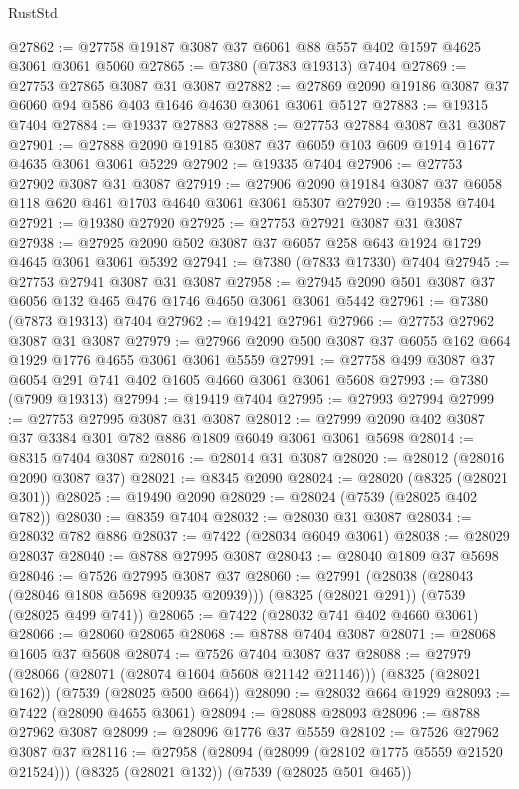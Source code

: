 \begin{lexlean}{RustStd}
\begin{coremodule}
@27862 := @27758 @19187 @3087 @37 @6061 @88 @557 @402 @1597 @4625 @3061 @3061 @5060
@27865 := @7380 (@7383 @19313) @7404
@27869 := @27753 @27865 @3087 @31 @3087
@27882 := @27869 @2090 @19186 @3087 @37 @6060 @94 @586 @403 @1646 @4630 @3061 @3061 @5127
@27883 := @19315 @7404
@27884 := @19337 @27883
@27888 := @27753 @27884 @3087 @31 @3087
@27901 := @27888 @2090 @19185 @3087 @37 @6059 @103 @609 @1914 @1677 @4635 @3061 @3061 @5229
@27902 := @19335 @7404
@27906 := @27753 @27902 @3087 @31 @3087
@27919 := @27906 @2090 @19184 @3087 @37 @6058 @118 @620 @461 @1703 @4640 @3061 @3061 @5307
@27920 := @19358 @7404
@27921 := @19380 @27920
@27925 := @27753 @27921 @3087 @31 @3087
@27938 := @27925 @2090 @502 @3087 @37 @6057 @258 @643 @1924 @1729 @4645 @3061 @3061 @5392
@27941 := @7380 (@7833 @17330) @7404
@27945 := @27753 @27941 @3087 @31 @3087
@27958 := @27945 @2090 @501 @3087 @37 @6056 @132 @465 @476 @1746 @4650 @3061 @3061 @5442
@27961 := @7380 (@7873 @19313) @7404
@27962 := @19421 @27961
@27966 := @27753 @27962 @3087 @31 @3087
@27979 := @27966 @2090 @500 @3087 @37 @6055 @162 @664 @1929 @1776 @4655 @3061 @3061 @5559
@27991 := @27758 @499 @3087 @37 @6054 @291 @741 @402 @1605 @4660 @3061 @3061 @5608
@27993 := @7380 (@7909 @19313)
@27994 := @19419 @7404
@27995 := @27993 @27994
@27999 := @27753 @27995 @3087 @31 @3087
@28012 := @27999 @2090 @402 @3087 @37 @3384 @301 @782 @886 @1809 @6049 @3061 @3061 @5698
@28014 := @8315 @7404 @3087
@28016 := @28014 @31 @3087
@28020 := @28012 (@28016 @2090 @3087 @37)
@28021 := @8345 @2090
@28024 := @28020 (@8325 (@28021 @301))
@28025 := @19490 @2090
@28029 := @28024 (@7539 (@28025 @402 @782))
@28030 := @8359 @7404
@28032 := @28030 @31 @3087
@28034 := @28032 @782 @886
@28037 := @7422 (@28034 @6049 @3061)
@28038 := @28029 @28037
@28040 := @8788 @27995 @3087
@28043 := @28040 @1809 @37 @5698
@28046 := @7526 @27995 @3087 @37
@28060 := @27991
    (@28038 (@28043 (@28046 @1808 @5698 @20935 @20939)))
    (@8325 (@28021 @291))
    (@7539 (@28025 @499 @741))
@28065 := @7422 (@28032 @741 @402 @4660 @3061)
@28066 := @28060 @28065
@28068 := @8788 @7404 @3087
@28071 := @28068 @1605 @37 @5608
@28074 := @7526 @7404 @3087 @37
@28088 := @27979
    (@28066 (@28071 (@28074 @1604 @5608 @21142 @21146)))
    (@8325 (@28021 @162))
    (@7539 (@28025 @500 @664))
@28090 := @28032 @664 @1929
@28093 := @7422 (@28090 @4655 @3061)
@28094 := @28088 @28093
@28096 := @8788 @27962 @3087
@28099 := @28096 @1776 @37 @5559
@28102 := @7526 @27962 @3087 @37
@28116 := @27958
    (@28094 (@28099 (@28102 @1775 @5559 @21520 @21524)))
    (@8325 (@28021 @132))
    (@7539 (@28025 @501 @465))

\end{coremodule}
\end{lexlean}
